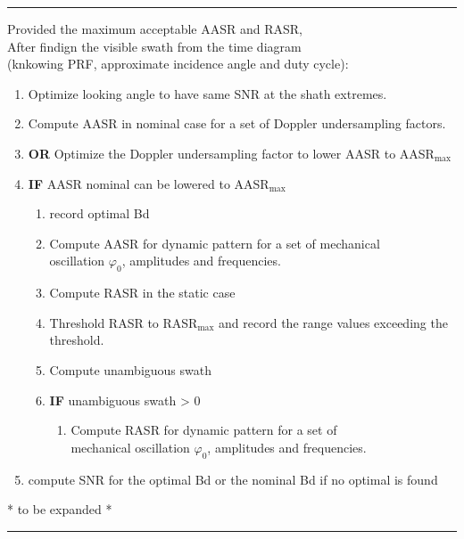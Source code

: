 \documentclass[11pt, a4paper]{scrartcl}
\begin{document}
    \vspace{\floatsep}
    \noindent\rule{\textwidth}{0.4pt}
    \begin{ttfamily}
        \small
        Provided the maximum acceptable AASR and RASR,\\
        After findign the visible swath from the time diagram \\(knkowing PRF, approximate incidence angle and duty cycle):
        \begin{enumerate}
            \item Optimize looking angle to have same SNR at the shath extremes.
            \item Compute AASR in nominal case for a set of Doppler undersampling factors.
            \item \textbf{OR} Optimize the Doppler undersampling factor to lower AASR to AASR$_{\text{max}}$
            \item \textbf{IF} AASR nominal can be lowered to AASR$_{\text{max}}$
            \begin{enumerate}
                \item record optimal Bd
                \item Compute AASR for dynamic pattern for a set of mechanical \\oscillation $\varphi_0$, amplitudes and frequencies.
                \item Compute RASR in the static case
                \item Threshold RASR to RASR$_{\text{max}}$ and record the range values exceeding the threshold.
                \item Compute unambiguous swath
                \item \textbf{IF} unambiguous swath > 0
                \begin{enumerate}
                    \item Compute RASR for dynamic pattern for a set of \\mechanical oscillation $\varphi_0$, amplitudes and frequencies.
                \end{enumerate}
            \end{enumerate}
            \item compute SNR for the optimal Bd or the nominal Bd if no optimal is found
        \end{enumerate}
    \end{ttfamily}

    * to be expanded *\\
    \noindent\rule{\textwidth}{0.4pt}
    \vspace{\floatsep}
\end{document}
